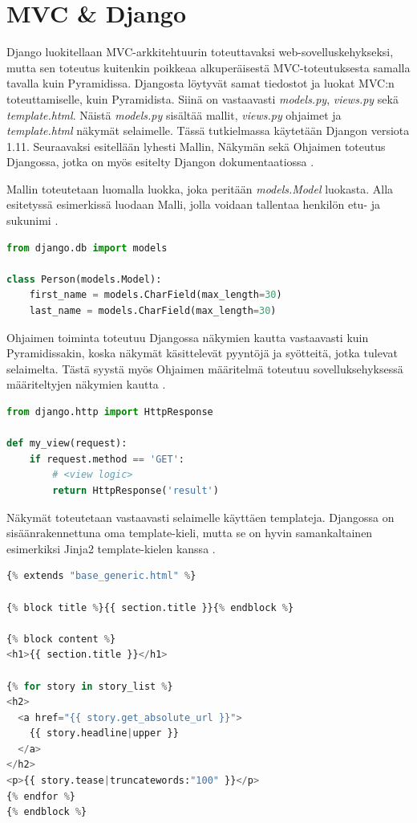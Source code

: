 \documentclass[utf8]{gradu3}
\begin{document}
\section{MVC \& Django}
Django luokitellaan MVC-arkkitehtuurin toteuttavaksi web-sovelluskehykseksi, mutta sen toteutus kuitenkin poikkeaa alkuperäisestä MVC-toteutuksesta samalla tavalla kuin Pyramidissa. Djangosta löytyvät samat tiedostot  ja luokat MVC:n toteuttamiselle, kuin Pyramidista. Siinä on vastaavasti \emph{models.py}, \emph{views.py} sekä \emph{template.html}. Näistä \emph{models.py} sisältää mallit, \emph{views.py} ohjaimet ja \emph{template.html} näkymät selaimelle. Tässä tutkielmassa  käytetään Djangon versiota 1.11. Seuraavaksi esitellään lyhesti Mallin, Näkymän sekä Ohjaimen toteutus Djangossa, jotka on myös esitelty Djangon dokumentaatiossa \parencite{django_docs}.

Mallin toteutetaan luomalla luokka, joka peritään \emph{models.Model} luokasta. Alla esitetyssä esimerkissä luodaan Malli, jolla voidaan tallentaa henkilön etu- ja sukunimi \parencite{django_model}.

\begin{lstlisting}[language=Python]
from django.db import models

class Person(models.Model):
    first_name = models.CharField(max_length=30)
    last_name = models.CharField(max_length=30)
\end{lstlisting}

Ohjaimen toiminta toteutuu Djangossa näkymien kautta vastaavasti kuin Pyramidissakin, koska näkymät käsittelevät pyyntöjä ja syötteitä, jotka tulevat selaimelta. Tästä syystä myös Ohjaimen määritelmä toteutuu  sovelluksehyksessä määriteltyjen näkymien kautta \parencite{django_view}.

\begin{lstlisting}[language=Python]
from django.http import HttpResponse

def my_view(request):
    if request.method == 'GET':
        # <view logic>
        return HttpResponse('result')
\end{lstlisting}

Näkymät toteutetaan vastaavasti selaimelle käyttäen templateja. Djangossa on sisäänrakennettuna oma template-kieli, mutta se on hyvin samankaltainen esimerkiksi Jinja2 template-kielen kanssa \parencite{django_template}.

\begin{lstlisting}[language=Python]
{% extends "base_generic.html" %}

{% block title %}{{ section.title }}{% endblock %}

{% block content %}
<h1>{{ section.title }}</h1>

{% for story in story_list %}
<h2>
  <a href="{{ story.get_absolute_url }}">
    {{ story.headline|upper }}
  </a>
</h2>
<p>{{ story.tease|truncatewords:"100" }}</p>
{% endfor %}
{% endblock %}
\end{lstlisting}
\end{document}

